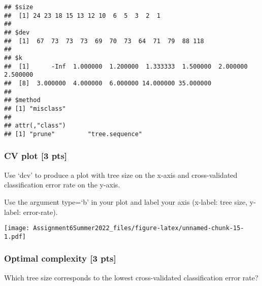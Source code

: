 \documentclass[
]{article}
\newenvironment{Shaded}{\begin{snugshade}}{\end{snugshade}}
\newcommand{\AttributeTok}[1]{\textcolor[rgb]{0.77,0.63,0.00}{#1}}
\newcommand{\CommentTok}[1]{\textcolor[rgb]{0.56,0.35,0.01}{\textit{#1}}}
\newcommand{\FunctionTok}[1]{\textcolor[rgb]{0.00,0.00,0.00}{#1}}
\newcommand{\NormalTok}[1]{#1}
\newcommand{\OtherTok}[1]{\textcolor[rgb]{0.56,0.35,0.01}{#1}}
\newcommand{\SpecialCharTok}[1]{\textcolor[rgb]{0.00,0.00,0.00}{#1}}
\newcommand{\StringTok}[1]{\textcolor[rgb]{0.31,0.60,0.02}{#1}}
\begin{document}
\begin{verbatim}
## $size
##  [1] 24 23 18 15 13 12 10  6  5  3  2  1
## 
## $dev
##  [1]  67  73  73  73  69  70  73  64  71  79  88 118
## 
## $k
##  [1]      -Inf  1.000000  1.200000  1.333333  1.500000  2.000000  2.500000
##  [8]  3.000000  4.000000  6.000000 14.000000 35.000000
## 
## $method
## [1] "misclass"
## 
## attr(,"class")
## [1] "prune"         "tree.sequence"
\end{verbatim}

\hypertarget{cv-plot-3-pts}{%
\subsubsection{CV plot {[}3 pts{]}}\label{cv-plot-3-pts}}

Use `dcv' to produce a plot with tree size on the x-axis and
cross-validated classification error rate on the y-axis.

Use the argument type=`b' in your plot and label your axis (x-label:
tree size, y-label: error-rate).

\begin{Shaded}
\end{Shaded}

\texttt{[image: Assignment6Summer2022\_files/figure-latex/unnamed-chunk-15-1.pdf]}

\hypertarget{optimal-complexity-3-pts}{%
\subsubsection{Optimal complexity {[}3
pts{]}}\label{optimal-complexity-3-pts}}

Which tree size corresponds to the lowest cross-validated classification
error rate?

\begin{Shaded}
\end{Shaded}
\end{document}
